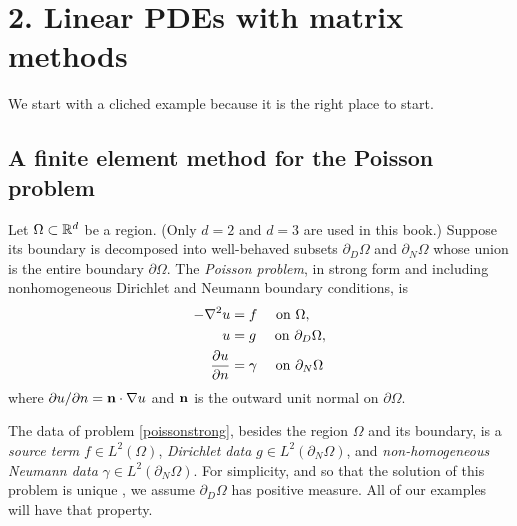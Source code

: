 
\chapter{2. Linear PDEs with matrix methods}

We start with a cliched example because it is the right place to start.

\section{A finite element method for the Poisson problem}

Let $\Omega \subset \mathbb{R}^d$ be a region.  (Only $d=2$ and $d=3$ are used in this book.)  Suppose its boundary is decomposed into well-behaved subsets $\partial_D \Omega$ and $\partial_N \Omega$ whose union is the entire boundary $\partial \Omega$.  The \emph{Poisson problem}, in strong form and including nonhomogeneous Dirichlet and Neumann boundary conditions, is
\begin{align}
- \nabla^2 u &= f \quad \text{ on } \Omega, \label{poissonstrong} \\
u &= g \quad \text{ on } \partial_D \Omega, \notag \\
\frac{\partial u}{\partial n} &= \gamma \quad \text{ on } \partial_N \Omega \notag
\end{align}
where $\partial u/\partial n = \mathbf{n} \cdot \nabla u$ and $\mathbf{n}$ is the outward unit normal on $\partial \Omega$.

The data of problem \eqref{poissonstrong}, besides the region $\Omega$ and its boundary, is a \emph{source term} $f\in L^2(\Omega)$, \emph{Dirichlet data} $g\in L^2(\partial_N \Omega)$, and \emph{non-homogeneous Neumann data} $\gamma\in L^2(\partial_N \Omega)$.  For simplicity, and so that the solution of this problem is unique \citep{Elmanetal2005}, we assume $\partial_D \Omega$ has positive measure.  All of our examples will have that property.

